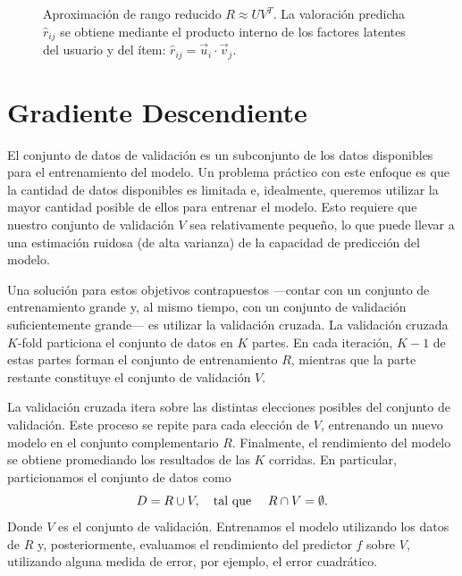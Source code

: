 \begin{figure}[htbp]
	\caption{Aproximación de rango reducido $R \approx UV^T$. La valoración predicha $\hat{r}_{ij}$ se obtiene mediante el producto interno de los factores latentes del usuario y del ítem: $\hat{r}_{ij} = \vec{u}_i \cdot \vec{v}_j$.}
	\label{fig:matrix_factorization}
\end{figure}

\section{Gradiente Descendiente}

El conjunto de datos de validación es un subconjunto de los datos disponibles para el entrenamiento del modelo. Un problema práctico con este enfoque es que la cantidad de datos disponibles es limitada e, idealmente, queremos utilizar la mayor cantidad posible de ellos para entrenar el modelo. Esto requiere que nuestro conjunto de validación $V$ sea relativamente pequeño, lo que puede llevar a una estimación ruidosa (de alta varianza) de la capacidad de predicción del modelo.

Una solución para estos objetivos contrapuestos —contar con un conjunto de entrenamiento grande y, al mismo tiempo, con un conjunto de validación suficientemente grande— es utilizar la validación cruzada. La validación cruzada $K$-fold particiona el conjunto de datos en $K$ partes. En cada iteración, $K-1$ de estas partes forman el conjunto de entrenamiento $R$, mientras que la parte restante constituye el conjunto de validación $V$.

La validación cruzada itera sobre las distintas elecciones posibles del conjunto de validación. Este proceso se repite para cada elección de $V$, entrenando un nuevo modelo en el conjunto complementario $R$. Finalmente, el rendimiento del modelo se obtiene promediando los resultados de las $K$ corridas. En particular, particionamos el conjunto de datos como
$$
D = R \cup V, \text{\quad tal que \quad} R \cap V = \emptyset.
$$
Donde $V$ es el conjunto de validación. Entrenamos el modelo utilizando los datos de $R$ y, posteriormente, evaluamos el rendimiento del predictor $f$ sobre $V$, utilizando alguna medida de error, por ejemplo, el error cuadrático.

